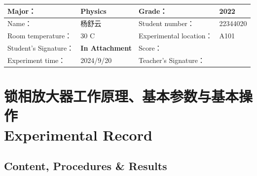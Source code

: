 
\begin{table}
	\renewcommand\arraystretch{1.7}
	\centering
	\begin{tabularx}{\textwidth}{|X|X|X|X|}
		\hline
		Major： & Physics & Grade： & 2022 \\
		\hline
		Name： & 杨舒云 & Student number： & 22344020\\
		\hline
		Room temperature： &30 \degree C & Experimental location： &  A101\\
		\hline
		Student's Signature：& \textbf{In Attachment} & Score： &\\
		\hline
		Experiment time：& 2024/9/20 & Teacher's Signature：&\\
		\hline
	\end{tabularx}
\end{table}
\section{锁相放大器工作原理、基本参数与基本操作  \\ Experimental Record}


\subsection{Content, Procedures \& Results}

